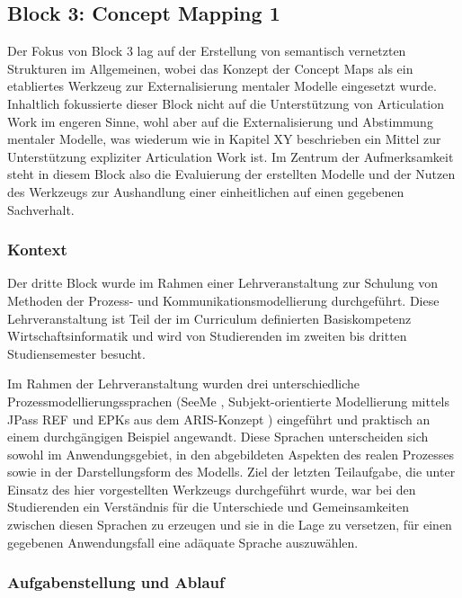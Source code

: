 
\subsection{Block 3: Concept Mapping 1}
\label{sub:eval_3}

Der Fokus von Block 3 lag auf der Erstellung von semantisch vernetzten Strukturen im Allgemeinen, wobei das Konzept der Concept Maps als ein etabliertes Werkzeug zur Externalisierung mentaler Modelle eingesetzt wurde. Inhaltlich fokussierte dieser Block nicht auf die Unterstützung von Articulation Work im engeren Sinne, wohl aber auf die Externalisierung und Abstimmung mentaler Modelle, was wiederum wie in Kapitel XY beschrieben ein Mittel zur Unterstützung expliziter Articulation Work ist. Im Zentrum der Aufmerksamkeit steht in diesem Block also die Evaluierung der erstellten Modelle und der Nutzen des Werkzeugs zur Aushandlung einer einheitlichen auf einen gegebenen Sachverhalt.

\subsubsection{Kontext} %
\label{ssub:3_kontext}

Der dritte Block wurde im Rahmen einer Lehrveranstaltung zur Schulung von Methoden der Prozess- und Kommunikationsmodellierung durchgeführt. Diese Lehrveranstaltung ist Teil der im Curriculum definierten Basiskompetenz Wirtschaftsinformatik und wird von Studierenden im zweiten bis dritten Studiensemester besucht.

Im Rahmen der Lehrveranstaltung wurden drei unterschiedliche Prozessmodellierungssprachen (SeeMe \citep{Herrmann04a}, Subjekt-orientierte Modellierung mittels JPass REF und \gls{EPK}s aus dem ARIS-Konzept \citep{Scheer00}) eingeführt und praktisch an einem durchgängigen Beispiel angewandt. Diese Sprachen unterscheiden sich sowohl im Anwendungsgebiet, in den abgebildeten Aspekten des realen Prozesses sowie in der Darstellungsform des Modells. Ziel der letzten Teilaufgabe, die unter Einsatz des hier vorgestellten Werkzeugs durchgeführt wurde, war bei den Studierenden ein Verständnis für die Unterschiede und Gemeinsamkeiten zwischen diesen Sprachen zu erzeugen und sie in die Lage zu versetzen, für einen gegebenen Anwendungsfall eine adäquate Sprache auszuwählen.  


\subsubsection{Aufgabenstellung und Ablauf} %
\label{ssub:3_aufgabenstellung}

